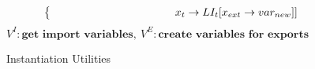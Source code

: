 \documentclass[sigplan,screen,anonymous]{acmart}
\begin{document}
\begin{figure*}[tbp]
\begin{align*}
\begin{cases*}
      \;        &\; \hspace{3.2cm} $x_t\rightarrow LI_t[x_{ext}\rightarrow var_{new}]]$
    \end{cases*} \\
  \end{align*}
  \hfill \footnotesize $\mathit{V}^I : \textbf{get  import variables},\: \mathit{V}^E : \textbf{create variables for exports}$
\caption{Instantiation Utilities}
\label{fig:inst-utils}
\end{figure*}






\end{document}
